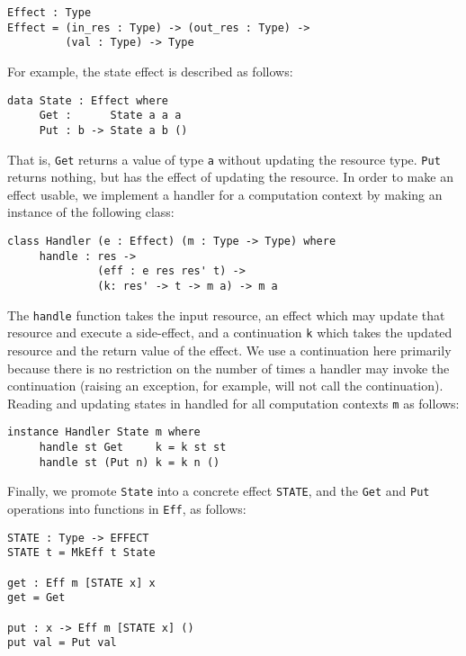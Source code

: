 \begin{Verbatim}
Effect : Type
Effect = (in_res : Type) -> (out_res : Type) -> 
         (val : Type) -> Type
\end{Verbatim}

For example, the state effect is described as follows:

\begin{Verbatim}
data State : Effect where
     Get :      State a a a
     Put : b -> State a b ()
\end{Verbatim}

That is, \texttt{Get} returns a value of type \texttt{a} without updating
the resource type. \texttt{Put} returns nothing, but has the effect of updating
the resource. In order to make an effect usable, we implement a handler
for a computation context by making an instance of the following class:

\begin{Verbatim}
class Handler (e : Effect) (m : Type -> Type) where
     handle : res -> 
              (eff : e res res' t) -> 
              (k: res' -> t -> m a) -> m a
\end{Verbatim}

The \texttt{handle} function takes the input resource, an effect which may
update that resource and execute a side-effect, and a continuation \texttt{k}
which takes the updated resource and the return value of the effect. We use
a continuation here primarily because there is no restriction on the number of
times a handler may invoke the continuation (raising an exception, for example,
will not call the continuation). Reading and updating states in handled
for all computation contexts \texttt{m} as follows:

\begin{Verbatim}
instance Handler State m where
     handle st Get     k = k st st
     handle st (Put n) k = k n ()
\end{Verbatim}

Finally, we promote \texttt{State} into a concrete effect \texttt{STATE}, and
the \texttt{Get} and \texttt{Put} operations into functions in \texttt{Eff}, as
follows:

\begin{Verbatim}
STATE : Type -> EFFECT
STATE t = MkEff t State

get : Eff m [STATE x] x
get = Get 

put : x -> Eff m [STATE x] ()
put val = Put val
\end{Verbatim}

